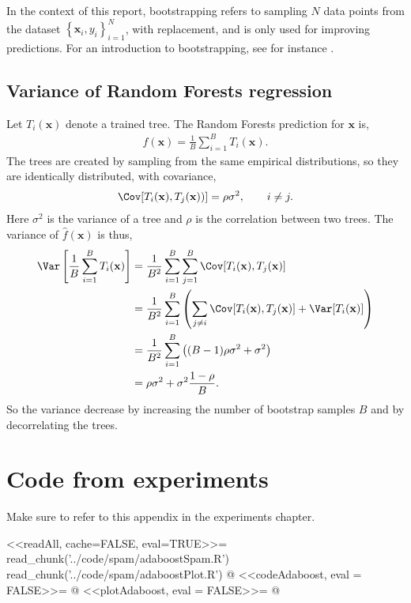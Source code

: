 In the context of this report, bootstrapping refers to sampling $N$ data points from the dataset $\left\{ \mathbf{x}_i, y_i \right\}_{i = 1}^N$, with replacement, and is only used for improving predictions. 
For an introduction to bootstrapping, see for instance \cite{efron1994bootstrap}.


\section{Variance of Random Forests regression}
\label{sec:Variance for Random Forests regression}
Let $T_i(\mathbf{x})$ denote a trained tree. The Random Forests prediction for $\mathbf{x}$ is,
\begin{align}
  \hat f(\mathbf{x}) = \frac{1}{B} \sum_{i = 1}^{B} T_i(\mathbf{x}).
\end{align}
The trees are created by sampling from the same empirical distributions, so they are identically distributed, with covariance,
\begin{align}
  \Cov[T_i(\mathbf{x}), T_j(\mathbf{x}))] = \rho \sigma^2, \quad \quad i \neq j.
\end{align}
Here $\sigma^2$ is the variance of a tree and $\rho$ is the correlation between two trees.  
The variance of $\hat f(\mathbf{x})$ is thus,
\begin{align}
\Var\left[ \frac{1}{B} \sum_{i = 1}^{B} T_i(\mathbf{x}) \right] 
&= \frac{1}{B^2} \sum_{i =1}^B \sum_{j= 1}^B \Cov[T_i(\mathbf{x}), T_j(\mathbf{x})] \notag \\
&= \frac{1}{B^2} \sum_{i =1}^B \left(\sum_{j \neq i} \Cov[T_i(\mathbf{x}), T_j(\mathbf{x})] + \Var[T_i(\mathbf{x})]  \right)\notag \\
&= \frac{1}{B^2} \sum_{i =1}^B \left( (B-1) \rho \sigma^2 + \sigma^2  \right)\notag \\
&= \rho \sigma^2 + \sigma^2 \frac{1-\rho}{B}.
\end{align}
So the variance decrease by increasing the number of bootstrap samples $B$ and by decorrelating the trees.

\chapter{Code from experiments}
\label{chap:Code}
Make sure to refer to this appendix in the experiments chapter.

<<readAll, cache=FALSE, eval=TRUE>>=
read_chunk('../code/spam/adaboostSpam.R')
read_chunk('../code/spam/adaboostPlot.R')
@
<<codeAdaboost, eval = FALSE>>=
@
<<plotAdaboost, eval = FALSE>>=
@
